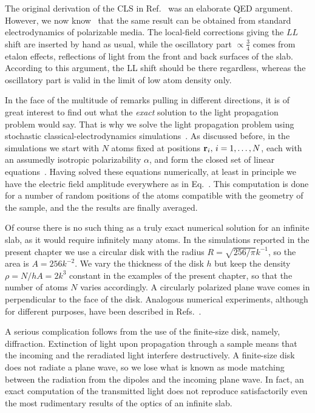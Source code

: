 The original derivation of the CLS in Ref.~\cite{FRIEDBERG1973101}  was an elaborate QED argument. However, we now know~\cite{PhysRevLett.108.173601,Javanainen:16} that the same result can be obtained from standard electrodynamics of polarizable media. The local-field corrections giving the $LL$ shift are inserted by hand as usual, while the oscillatory part $\propto\frac{3}{4}$ comes from etalon effects, reflections of light from the front and back surfaces of the slab. According to this argument, the LL shift should be there regardless, whereas the oscillatory part is valid in the limit of low atom density only.

In the face of the multitude of remarks pulling in different directions, it is of great interest to find out what the {\em exact\/} solution to the light propagation problem would say. That is why we solve the light propagation problem using stochastic classical-electrodynamics simulations~\cite{PhysRevA.59.649,PhysRevE.69.026605,PhysRevLett.101.103602,1367-2630-14-5-055001,PhysRevA.86.031602,PhysRevB.86.085116,PhysRevB.86.205128,PhysRevA.88.033844}. As discussed before, in the simulations we start with $N$ atoms fixed at positions ${\bf r}_i,\, i=1,\dots,N$, each with an assumedly isotropic polarizability $\alpha$, and form the closed set of linear equations~. Having solved these equations numerically, at least in principle we have the electric field amplitude everywhere as in Eq.~. This computation is done for a number of random positions of the atoms compatible with the geometry of the sample, and the the results are finally averaged.

Of course there is no such thing as a truly exact numerical solution for an infinite slab, as it would require infinitely many atoms. In the simulations reported in the present chapter we use a circular disk with the radius $R=\sqrt{256/\pi}k^{-1}$, so the area is $A=256k^{-2}$. We vary the thickness of the disk $h$ but keep the density $\rho=N/hA=2k^3$ constant in the examples of the present chapter, so that the number of atoms $N$ varies accordingly. A circularly polarized plane wave comes in perpendicular to the face of the disk. Analogous numerical experiments, although for different purposes, have been described in Refs.~\cite{1367-2630-14-5-055001,PhysRevA.86.031602}.  

A serious complication follows from the use of the finite-size disk, namely, diffraction. Extinction of light upon propagation through a sample means that the incoming and the reradiated light interfere destructively. A finite-size disk does not radiate a plane wave, so we lose what is known as mode matching between the radiation from the dipoles and the incoming plane wave. In fact, an exact computation of the transmitted light does not reproduce satisfactorily even the most rudimentary results of the optics of an infinite slab.

